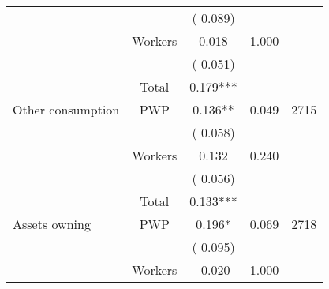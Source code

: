 \begin{tabular}{l*{4}{c}}
                               &                               &       (       0.089)                              & &                                                                             \\ 
                               &       Workers         &              0.018                 &        1.000    &                                               \\ 
                               &                               &       (       0.051)                              & &                                                                             \\ 
\cmidrule{2-3}
                               &       Total           &              0.179***                 &    &                                               \\ 
\cmidrule{2-3}
 Other consumption                 &       PWP     &              0.136**                 &        0.049    & 2715                               \\ 
                               &                               &       (       0.058)                              & &                                                                             \\ 
                               &       Workers         &              0.132                 &        0.240    &                                               \\ 
                               &                               &       (       0.056)                              & &                                                                             \\ 
\cmidrule{2-3}
                               &       Total           &              0.133***                 &    &                                               \\ 
\cmidrule{2-3}
 Assets owning                 &       PWP     &              0.196*                 &        0.069    & 2718                               \\ 
                               &                               &       (       0.095)                              & &                                                                             \\ 
                               &       Workers         &             -0.020               &        1.000   &                                               \\ 

\end{tabular}
